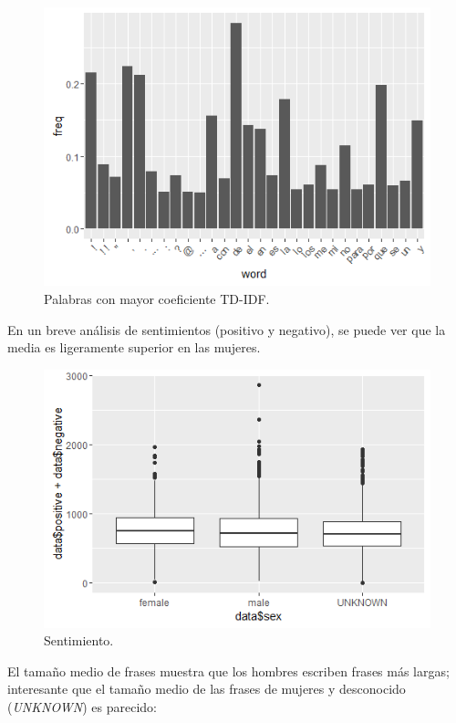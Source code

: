 \documentclass[11pt,a4paper]{article}
\begin{document}
  \begin{figure}[ht!]
    \includegraphics[width=\linewidth]{most_used_words.png}
    \caption{Palabras con mayor coeficiente TD-IDF.}
    \label{fig:most_used_words}
  \end{figure}
    
  En un breve an\'alisis de sentimientos (positivo y negativo), se puede ver que la media es ligeramente superior en las mujeres.
  
  \begin{figure}[ht!]
    \includegraphics[width=\linewidth]{sentiment.png}
    \caption{Sentimiento.}
    \label{fig:sentiment}
  \end{figure}
  
  El tama\~no medio de frases muestra que los hombres escriben frases m\'as largas; interesante que el tama\~no medio de las frases de mujeres y desconocido ({\em UNKNOWN}) es parecido:
\end{document}
